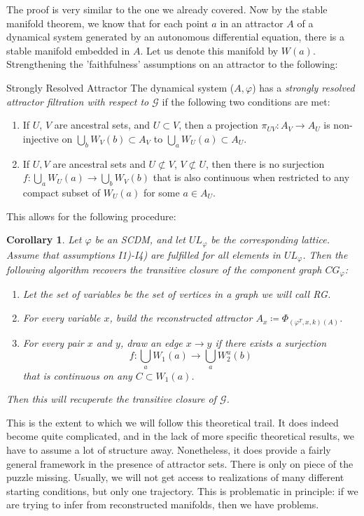 \documentclass[11pt, a4paper]{memoir}
\theoremstyle{break}
\newtheorem{cor}{Corollary}
\theoremstyle{break}
\theoremstyle{nonumberplain}
\begin{document}
The proof is very similar to the one we already covered. Now by the stable manifold theorem, we know that for each point $a$ in an attractor $A$ of a dynamical system generated by an autonomous differential equation, there is a stable manifold embedded in $A$. Let us denote this manifold by $W(a)$. Strengthening the 'faithfulness' assumptions on an attractor to the following:
\begin{mydefinition}{Strongly Resolved Attractor}
The dynamical system ($A,\varphi$) has a \emph{strongly resolved attractor filtration with respect to $\mathcal{G}$} if the following two conditions are met:
\begin{enumerate}[label=\arabic*)]
	\item If $U$, $V$ are ancestral sets, and $U\subset V$, then a projection $\pi_{UV}:A_V\to A_U$ is non-injective on $\bigcup_b W_V(b)\subset A_V$ to $\bigcup_a W_U(a)\subset A_U$.
	\item If $U,V$ are ancestral sets and $U\not\subset V$, $V\not\subset U$, then there is no surjection $f:\bigcup_{a} W_U(a)\to\bigcup_b W_V(b)$ that is also continuous when restricted to any compact subset of $W_U(a)$ for some $a\in A_U$.
\end{enumerate}
\end{mydefinition}
This allows for the following procedure:
\begin{cor}
Let $\varphi$ be an SCDM, and let $UL_\varphi$ be the corresponding lattice. Assume that assumptions I1)-I4) are fulfilled for all elements in $UL_\varphi$. Then the following algorithm recovers the transitive closure of the component graph $CG_\varphi$:
\begin{enumerate}[label=\roman*.]
	\item Let the set of variables be the set of vertices in a graph we will call \emph{RG}.
	\item For every variable $x$, build the reconstructed attractor $A_x\coloneqq \Phi	_{(\varphi^T,x,k)(A)}$.
	\item For every pair $x$ and $y$, draw an edge $x\to y$ if there exists a surjection
	 $$f:\bigcup_a W_1(a) \to \bigcup_a W_2^u(b)$$ 
	 that is continuous on any $C\subset W_1(a)$.
\end{enumerate}
Then this will recuperate the transitive closure of $\mathcal{G}$.
\end{cor}
This is the extent to which we will follow this theoretical trail. It does indeed become quite complicated, and in the lack of more specific theoretical results, we have to assume a lot of structure away. Nonetheless, it does provide a fairly general framework in the presence of attractor sets. There is only on piece of the puzzle missing. Usually, we will not get access to realizations of many different starting conditions, but only one trajectory. This is problematic in principle: if we are trying to infer from reconstructed manifolds, then we have problems.\\[20pt]
\end{document}
